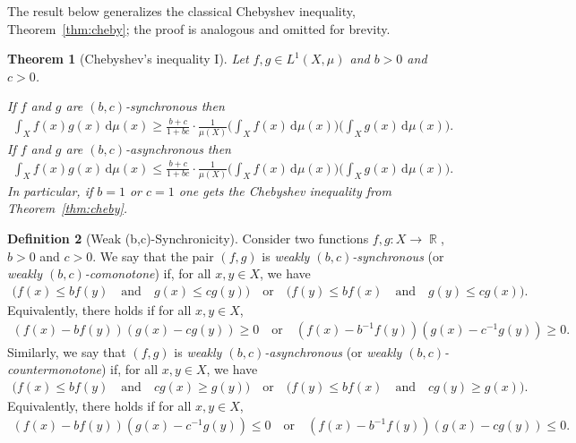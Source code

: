 \documentclass[12pt, reqno]{amsart}%
\theoremstyle{plain}  %
\newtheorem{theorem}{Theorem}[section]
\theoremstyle{definition}  %
\newtheorem{definition}[theorem]{Definition}
\theoremstyle{remark}
\numberwithin{equation}{section}
\DeclareMathOperator{\R}{\mathbb{R}}
\renewcommand{\d}{\,\mathrm{d}}
\begin{document}
The result below generalizes the classical Chebyshev inequality, Theorem~\ref{thm:cheby}; the proof is analogous and omitted for brevity.
\begin{theorem}[Chebyshev's inequality I]\label{thm:cheby-scaled}
Let $f,g \in L^1( X, \mu)$ and  $b > 0$ and $c > 0$.

If $f$ and $g$ are $(b,c)$-\emph{synchronous} then
\begin{align*}
\int_X f(x) g(x) \d\mu(x) \geq \frac{b + c}{1 + bc} \cdot \frac{1}{\mu(X)}
\Big(\int_X f(x)\d\mu(x) \Big)\Big(\int_X g(x)\d\mu(x)\Big).
\end{align*}
If $f$ and $g$ are $(b,c)$-\emph{asynchronous}  then
\begin{align*}
\int_X f(x) g(x) \d\mu(x) \leq\frac{b + c}{1 + bc} \cdot \frac{1}{\mu(X)}
\Big(\int_X f(x)\d\mu(x) \Big)\Big(\int_X g(x)\d\mu(x)\Big).
\end{align*}
In particular, if $b=1$ or $c=1$ one gets the Chebyshev inequality from Theorem~\ref{thm:cheby}.
\end{theorem}

\begin{definition}[Weak (b,c)-Synchronicity]
Consider two functions $f, g: X \to \R$,  $b > 0$ and $c > 0$. We say that the pair $(f, g)$ is \emph{weakly $(b,c)$-synchronous} (or \emph{weakly $(b,c)$-comonotone}) if,  for all $x, y \in X$, we have
\begin{align*}
\big( f(x) \leq b f(y) \quad \text{and} \quad g(x) \leq c g(y) \big)
\quad \text{or} \quad
\big( f(y) \leq b f(x) \quad \text{and} \quad g(y) \leq c g(x) \big).
\end{align*}
Equivalently, there holds if for all $x, y \in X$,
\begin{align*}
(f(x) - b f(y))(g(x) - c g(y)) \geq 0\quad \text{or} \quad
(f(x) - b^{-1} f(y))(g(x) - c^{-1}g(y))\geq 0.
\end{align*}
Similarly, we say that $(f, g)$ is \emph{weakly $(b,c)$-asynchronous} (or \emph{weakly $(b,c)$-countermonotone}) if,  for all $x, y \in X$, we have
\begin{align*}
\big(f(x) \leq b f(y) \quad \text{and} \quad cg(x) \geq  g(y) \big)
\quad \text{or} \quad
\big( f(y) \leq b f(x) \quad \text{and} \quad cg(y) \geq g(x) \big).
\end{align*}
Equivalently, there holds if for all $x, y \in X$,
\begin{align*}
(f(x) - b f(y))(g(x) - c^{-1} g(y)) \leq 0\quad \text{or} \quad
(f(x) - b^{-1} f(y))(g(x) - cg(y))\leq 0.
\end{align*}

\end{definition}
\end{document}
